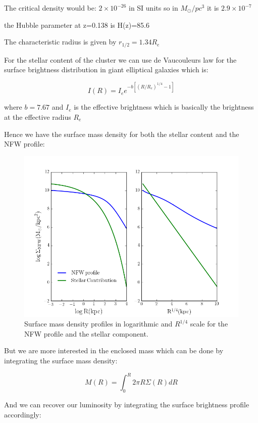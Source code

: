 The critical density would be: $2\times 10^{-26}$ in SI units so in $M_{\odot}/pc^{3}$ it is $2.9\times 10^{-7}$


the Hubble parameter at z=0.138 is H(z)=85.6

The characteristic radius is given by $r_{1/2}=1.34R_{e}$

For the stellar content of the cluster we can use de Vaucouleurs law for the surface brightness distribution in giant elliptical galaxies which is:

\begin{equation}
I(R)=I_{e}e^{-b\left[\left(R/R_{e}\right)^{1/4}-1\right]}
\end{equation}

where $b=7.67$ and $I_{e}$ is the effective brightness which is basically the brightness at the effective radius $R_{e}$

Hence we have the surface mass density for both the stellar content and the NFW profile:

\begin{figure}[H]
\centering
\includegraphics[width=12cm]{images/Surface_mass_density_log.png}
\caption[Surface mass density profiles]{Surface mass density profiles in logarithmic and $R^{1/4}$ scale for the NFW profile and the stellar component.}
\end{figure}

But we are more interested in the enclosed mass which can be done by integrating the surface mass density:

\begin{equation}
M(R)=\int_{0}^{R}2\pi R\Sigma(R)dR
\end{equation}

And we can recover our luminosity by integrating the surface brightness profile accordingly:

